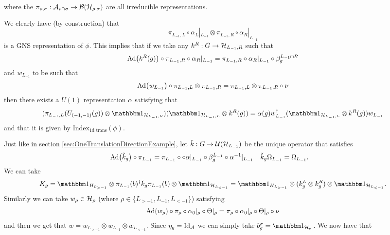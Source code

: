 \documentclass[12pt,a4paper,twoside]{article}
\numberwithin{equation}{section}
\begin{document}
where the $\pi_{\rho,\sigma}:\AA_{\rho\cap\sigma}\rightarrow\BB(\HH_{\rho,\sigma})$ are all irreducible representations.
\begin{remark}\label{rem:GNS_One_DimensionalTwoTranslations}
	We clearly have (by construction) that
	\begin{equation}
		\pi_{L_{-1},L}\circ\alpha_L|_{L_{-1}}\otimes \pi_{L_{-1},R}\circ\alpha_R|_{L_{-1}}
	\end{equation}
	is a GNS representation of $\phi$. This implies that if we take any $k^R:G\rightarrow \HH_{L_{-1},R}$ such that
	\begin{equation}
		\Ad{k^R(g)}\circ\pi_{L_{-1},R}\circ\alpha_R|_{L_{-1}}=\pi_{L_{-1},R}\circ\alpha_R|_{L_{-1}}\circ\beta_{g}^{L_{-1}\cap R}
	\end{equation}
	and $w_{L_{-1}}$ to be such that
	\begin{equation}
		\Ad{w_{L_{-1}}}\circ\pi_{L_{-1},L}\otimes \pi_{L_{-1},R}=\pi_{L_{-1},L}\otimes \pi_{L_{-1},R}\circ\nu
	\end{equation}
	then there exists a $U(1)$ representation $\alpha$ satisfying that
	\begin{equation}
		(\pi_{L_{-1},L}(U_{(-1,-1)}(g))\otimes \id_{\HH_{L_{-1},R}}) (\id_{\HH_{L_{-1},L}}\otimes k^R(g))=\alpha(g) w_{L_{-1}}^\dagger(\id_{\HH_{L_{-1},L}}\otimes k^R(g))w_{L_{-1}}
	\end{equation}
	and that it is given by $\textrm{Index}_{\text{1d trans}}(\phi)$.
\end{remark}
Just like in section \ref{sec:OneTranslationDirectionExample}, let $\tilde k:G\rightarrow \UU(\HH_{L_{-1}})$ be the unique operator that satisfies
\begin{align}
	\Ad{\tilde{k}_g}\circ\pi_{L_{-1}}&=\pi_{L_{-1}}\circ \circ\alpha|_{L_{-1}}\circ\beta_g^{L_{-1}}\circ \alpha^{-1}|_{L_{-1}}&\tilde k_g\Omega_{L_{-1}}&=\Omega_{L_{-1}}.
\end{align}
We can take
\begin{equation}
	K_g=\id_{H_{L_{>-1}}}\otimes \pi_{L_{-1}}(b)^\dagger \tilde k_g \pi_{L_{-1}}(b) \otimes\id_{\HH_{L_{<-1}}} =\id_{H_{L_{>-1}}}\otimes (k_g^L\otimes k_g^R) \otimes\id_{\HH_{L_{<-1}}}.
\end{equation}
Similarly we can take $w_\rho\in\HH_\rho$ (where $\rho\in\{L_{>-1},L_{-1},L_{<-1}\}$) satisfying
\begin{equation}
	\Ad{w_\rho}\circ\pi_\rho\circ\alpha_{0}|_\rho\circ\Theta|_\rho=\pi_\rho\circ\alpha_{0}|_\rho\circ\Theta|_\rho\circ\nu
\end{equation}
and then we get that $w=w_{L_{>-1}}\otimes w_{L_{-1}}\otimes w_{L_{<-1}}$. Since $\eta_g=\textrm{Id}_{\AA}$ we can simply take $b_g^\sigma=\id_{\HH_\sigma}$. We now have that
\end{document}

